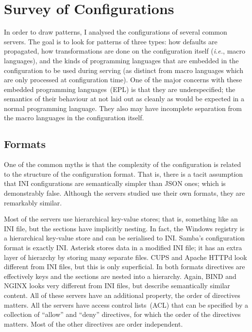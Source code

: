\documentclass[letterpaper,twocolumn,10pt]{article}
\begin{document}
\section{Survey of Configurations}
In order to draw patterns, I analysed the configurations of several common servers. The goal is to look for patterns of three types: how defaults are propagated, how transformations are done on the configuration itself (\emph{i.e.}, macro languages), and the kinds of programming languages that are embedded in the configuration to be used during serving (as distinct from macro languages which are only processed at configuration time). One of the major concerns with these embedded programming languages~(EPL) is that they are underspecified; the semantics of their behaviour at not laid out as cleanly as would be expected in a normal programming language. They also may have incomplete separation from the macro languages in the configuration itself.

\subsection{Formats}
One of the common myths is that the complexity of the configuration is related to the structure of the configuration format. That is, there is a tacit assumption that INI configurations are semantically simpler than JSON ones; which is demonstrably false. Although the servers studied use their own formats, they are remarkably similar.

Most of the servers use hierarchical key-value stores; that is, something like an INI file, but the sections have implicitly nesting. In fact, the Windows registry is a hierarchical key-value store and can be serialised to INI. Samba's configuration format is exactly INI. Asterisk stores data in a modified INI file; it has an extra layer of hierarchy by storing many separate files. CUPS and Apache HTTPd look different from INI files, but this is only superficial. In both formats directives are effectively keys and the sections are nested into a hierarchy. Again, BIND and NGINX looks very different from INI files, but describe semantically similar content. All of these servers have an additional property, the order of directives matters. All the servers have access control lists~(ACL) that can be specified by a collection of ``allow'' and ``deny'' directives, for which the order of the directives matters. Most of the other directives are order independent.
\end{document}

